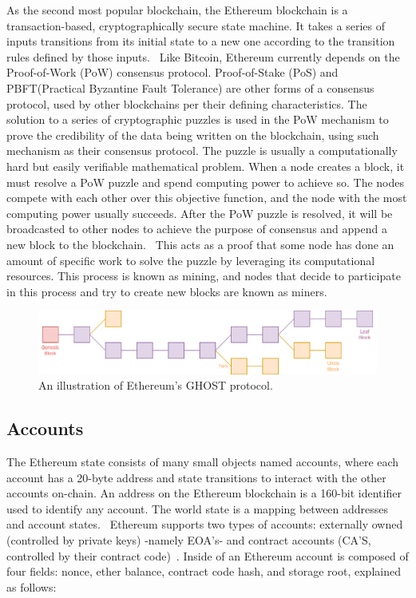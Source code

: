     As the second most popular blockchain, the Ethereum blockchain is a transaction-based, cryptographically secure state machine.
    It takes a series of inputs transitions from its initial state to a new one according to the transition rules defined by those inputs.~\cite{ferreira2022smart}
    Like Bitcoin, Ethereum currently depends on the Proof-of-Work (PoW) consensus protocol.
    Proof-of-Stake (PoS) and PBFT(Practical Byzantine Fault Tolerance) are other forms of a consensus protocol, used by other blockchains per their defining characteristics.
    The solution to a series of cryptographic puzzles is used in the PoW mechanism to prove the credibility of the data being written on the blockchain, using such mechanism as their consensus protocol.
    The puzzle is usually a computationally hard but easily verifiable mathematical problem.
    When a node creates a block, it must resolve a PoW puzzle and spend computing power to achieve so.
    The nodes compete with each other over this objective function, and the node with the most computing power usually succeeds.
    After the PoW puzzle is resolved, it will be broadcasted to other nodes to achieve the purpose of consensus and append a new block to the blockchain.~\cite{li2020survey}
    This acts as a proof that some node has done an amount of specific work to solve the puzzle by leveraging its computational resources.
    This process is known as mining, and nodes that decide to participate in this process and try to create new blocks are known as miners.

    \begin{figure}
        \centering
        \includegraphics[width=\textwidth]{figures/uncle.png}
        \caption{An illustration of Ethereum's GHOST protocol.}
        \label{fig:uncle}
    \end{figure}

    \subsection{Accounts}
        The Ethereum state consists of many small objects named accounts, where each account has a 20-byte address and state transitions to interact with the other accounts on-chain.
        An address on the Ethereum blockchain is a 160-bit identifier used to identify any account.
        The world state is a mapping between addresses and account states.~\cite{wood2014ethereum}
        Ethereum supports two types of accounts: externally owned
        (controlled by private keys) -namely EOA's- and contract accounts (CA'S, controlled by their contract code)~\cite{ethereum2014ethereum}.
        Inside of an Ethereum account is composed of four fields: nonce, ether balance, contract code hash, and storage root, explained as follows:

